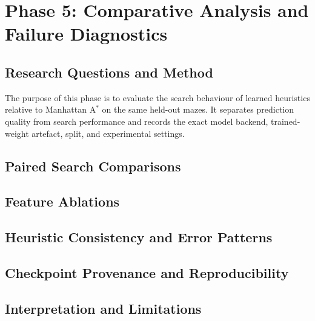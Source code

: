 \section{Phase 5: Comparative Analysis and Failure Diagnostics}
\label{sec:d3-phase5}

\subsection{Research Questions and Method}
The purpose of this phase is to evaluate the search behaviour of learned
heuristics relative to Manhattan A$^\ast$ on the same held-out mazes. It
separates prediction quality from search performance and records the exact
model backend, trained-weight artefact, split, and experimental settings.

\subsection{Paired Search Comparisons}
% 

\subsection{Feature Ablations}
% 

\subsection{Heuristic Consistency and Error Patterns}

\subsection{Checkpoint Provenance and Reproducibility}

\subsection{Interpretation and Limitations}
